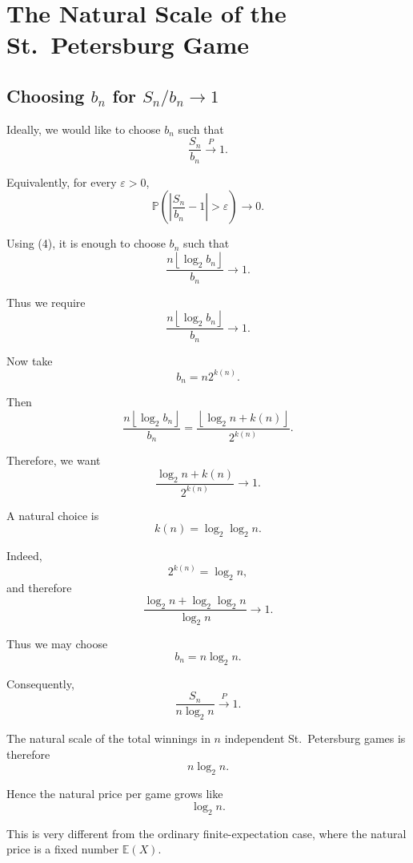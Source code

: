
\section{The Natural Scale of the St.\ Petersburg Game}

\subsection{Choosing \(b_n\) for \(S_n/b_n\to1\)}

Ideally, we would like to choose $b_n$ such that
\[
\boxed{
\frac{S_n}{b_n}
\xrightarrow{P}1.
}
\]

Equivalently, for every $\varepsilon>0$,
\[
\mathbb{P}
\left(
\left|
\frac{S_n}{b_n}-1
\right|
>\varepsilon
\right)
\longrightarrow0.
\]

Using (4), it is enough to choose $b_n$ such that
\[
\frac{
n\left\lfloor\log_2b_n\right\rfloor
}{b_n}
\longrightarrow1.
\]

Thus we require
\[
\boxed{
\frac{
n\left\lfloor\log_2b_n\right\rfloor
}{b_n}
\longrightarrow1.
}
\tag{5}
\]

Now take
\[
b_n=n2^{k(n)}.
\]

Then
\[
\frac{
n\left\lfloor\log_2b_n\right\rfloor
}{b_n}
=
\frac{
\left\lfloor
\log_2n+k(n)
\right\rfloor
}{
2^{k(n)}
}.
\]

Therefore, we want
\[
\frac{
\log_2n+k(n)
}{
2^{k(n)}
}
\longrightarrow1.
\]

A natural choice is
\[
\boxed{
k(n)=\log_2\log_2 n.
}
\]

Indeed,
\[
2^{k(n)}
=
\log_2 n,
\]
and therefore
\[
\frac{
\log_2n+\log_2\log_2n
}{
\log_2n
}
\longrightarrow1.
\]

Thus we may choose
\[
\boxed{
b_n
=
n\log_2n.
}
\]

Consequently,
\[
\boxed{
\frac{S_n}{n\log_2n}
\xrightarrow{P}1.
}
\]

\begin{observation}

The natural scale of the total winnings in $n$ independent
St.\ Petersburg games is therefore
\[
n\log_2n.
\]

Hence the natural price per game grows like
\[
\boxed{
\log_2n.
}
\]

This is very different from the ordinary finite-expectation case,
where the natural price is a fixed number $\mathbb{E}(X)$.

\end{observation}


